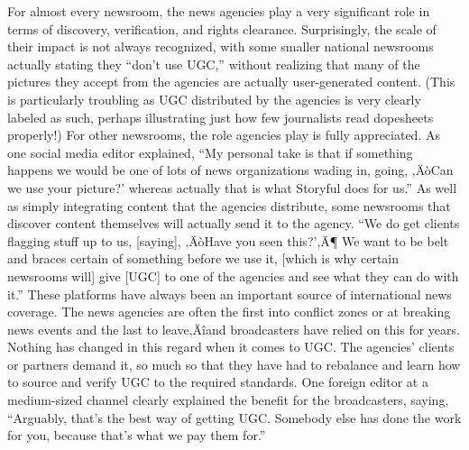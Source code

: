 \documentclass[symmetric, notoc, nobib]{towcenter-book}
\begin{document}
\begin{enumerate}
For almost every newsroom, the news agencies play a very significant role in
terms of discovery, verification, and rights clearance. Surprisingly, the scale
of their impact is not always recognized, with some smaller national newsrooms
actually stating they ``don't use UGC,'' without realizing that many
of the pictures they accept from the agencies are actually user-generated
content. (This is particularly troubling as UGC distributed by the agencies
is very clearly labeled as such, perhaps illustrating just how few journalists
read dopesheets properly!)
For other newsrooms, the role agencies play is fully appreciated. As one
social media editor explained, ``My personal take is that if something happens
we would be one of lots of news organizations wading in, going, ‚ÄòCan
we use your picture?' whereas actually that is what Storyful does for us.''
As well as simply integrating content that the agencies distribute, some
newsrooms that discover content themselves will actually send it to the
agency. ``We do get clients flagging stuff up to us, [saying], ‚ÄòHave you seen
this?'‚Ä¶ We want to be belt and braces certain of something before we use
it, [which is why certain newsrooms will] give [UGC] to one of the agencies
and see what they can do with it.''
These platforms have always been an important source of international
news coverage. The news agencies are often the first into conflict zones or at
breaking news events and the last to leave‚Äîand broadcasters have relied on
this for years. Nothing has changed in this regard when it comes to UGC.
The agencies' clients or partners demand it, so much so that they have had
to rebalance and learn how to source and verify UGC to the required standards.
One foreign editor at a medium-sized channel clearly explained the
benefit for the broadcasters, saying, ``Arguably, that's the best way of getting
UGC. Somebody else has done the work for you, because that's what we pay
them for.''


\end{enumerate}
\end{document}
